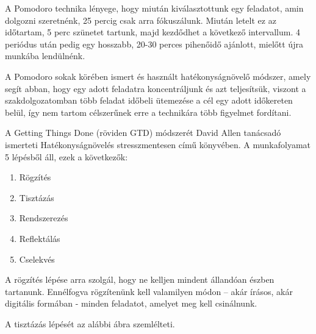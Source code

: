  

A Pomodoro technika lényege, hogy miután kiválasztottunk egy feladatot, amin dolgozni szeretnénk, 25 percig csak arra fókuszálunk. Miután letelt ez az időtartam, 5 perc szünetet tartunk, majd kezdődhet a következő intervallum. 4 periódus után pedig egy hosszabb, 20-30 perces pihenőidő ajánlott, mielőtt újra munkába lendülnénk.

A Pomodoro sokak körében ismert és használt hatékonyságnövelő módszer, amely segít abban, hogy egy adott feladatra koncentráljunk és azt teljesítsük, viszont a szakdolgozatomban több feladat időbeli ütemezése a cél egy adott időkereten belül, így nem tartom célszerűnek erre a technikára több figyelmet fordítani.


A Getting Things Done (röviden GTD) módszerét David Allen tanácsadó ismerteti Hatékonyságnövelés stresszmentesen című könyvében. A munkafolyamat 5 lépésből áll, ezek a következők:
\begin{enumerate}
\item Rögzítés
\item Tisztázás
\item Rendszerezés
\item Reflektálás
\item Cselekvés
\end{enumerate}

A rögzítés lépése arra szolgál, hogy ne kelljen mindent állandóan észben tartanunk. Ennélfogva rögzítenünk kell valamilyen módon – akár írásos, akár digitális formában - minden feladatot, amelyet meg kell csinálnunk.

A tisztázás lépését az alábbi ábra szemlélteti.

